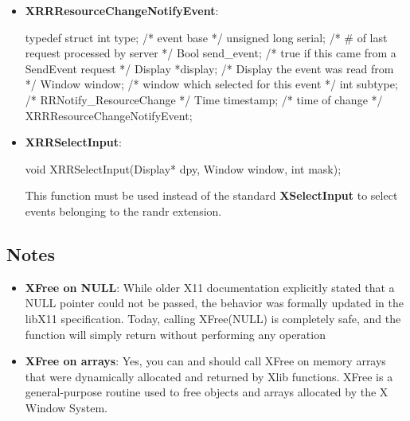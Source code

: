 \documentclass{report}
\begin{document}
\begin{itemize}
                \item \textbf{XRRResourceChangeNotifyEvent}:
                    \bigbreak \noindent 
                    \begin{cppcode}
                        typedef struct {
                            int type;			/* event base */
                            unsigned long serial;	/* # of last request processed by server */
                            Bool send_event;		/* true if this came from a SendEvent request */
                            Display *display;		/* Display the event was read from */
                            Window window;		/* window which selected for this event */
                            int subtype;		/* RRNotify_ResourceChange */
                            Time timestamp;		/* time of change */
                        } XRRResourceChangeNotifyEvent;
                    \end{cppcode}
                \item \textbf{XRRSelectInput}: 
                    \bigbreak \noindent 
                    \begin{cppcode}
                    void XRRSelectInput(Display* dpy, Window window, int mask);
                    \end{cppcode}
                    \bigbreak \noindent 
                    This function must be used instead of the standard \textbf{XSelectInput} to select events belonging to the randr extension.


    


    \end{itemize}

    \pagebreak 
    \subsection{Notes}
    \begin{itemize}
        \item \textbf{XFree on NULL}:  While older X11 documentation explicitly stated that a NULL pointer could not be passed, the behavior was formally updated in the libX11 specification. Today, calling XFree(NULL) is completely safe, and the function will simply return without performing any operation
        \item \textbf{XFree on arrays}: Yes, you can and should call XFree on memory arrays that were dynamically allocated and returned by Xlib functions. XFree is a general-purpose routine used to free objects and arrays allocated by the X Window System.

    \end{itemize}















    
\end{document}
